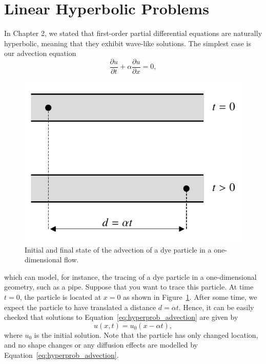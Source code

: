 \section{Linear Hyperbolic Problems} \label{sec:linear_hyperb_problems}
In Chapter 2, we stated that first-order partial differential equations are naturally hyperbolic, meaning that they exhibit wave-like solutions. The simplest case is our advection equation
\begin{equation}
	\frac{\partial u}{\partial t} + \alpha \frac{\partial u}{\partial x} = 0, 
	\label{eq:hyperprob_advection}
\end{equation}
\begin{figure}[htbp]
	\centering
	\includegraphics[width=0.5\linewidth]{Pictures/lsc_advection_dye}
	\caption{Initial and final state of the advection of a dye particle in a one-dimensional flow.}
	\label{fig:advection_dye}
\end{figure}
which can model, for instance, the tracing of a dye particle in a one-dimensional geometry, such as a pipe. Suppose that you want to trace this particle. At time $t=0$, the particle is located at $x=0$ as shown in Figure~\ref{fig:advection_dye}. After some time, we expect the particle to have translated a distance $d=\alpha t$. Hence, it can be easily checked that solutions to Equation~\ref{eq:hyperprob_advection} are given by
\begin{equation}
	u(x,t) = u_0 (x - \alpha t), 
\end{equation}
where $u_0$ is the initial solution. Note that the particle has only changed location, and no shape changes or any diffusion effects are modelled by Equation~\ref{eq:hyperprob_advection}.

